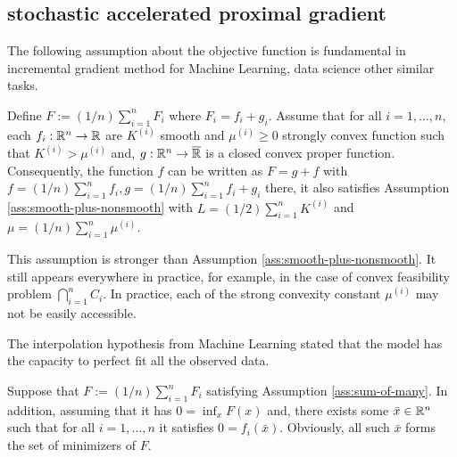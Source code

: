 \documentclass[12pt]{article}
\begin{document}

    
    \subsection{stochastic accelerated proximal gradient}
        The following assumption about the objective function is fundamental in incremental gradient method for Machine Learning, data science other similar tasks. 
        \begin{assumption}\label{ass:sum-of-many}
            Define $F := (1/n)\sum_{i = 1}^{n} F_i$ where $F_i = f_i + g_i$.
            Assume that for all $i = 1, \ldots, n$, each $f_i:\mathbb R^n \rightarrow \mathbb R$ are $K^{(i)}$ smooth and $\mu^{(i)} \ge 0$ strongly convex function such that $K^{(i)} > \mu^{(i)}$ and, $g:\mathbb R^n \rightarrow \overline {\mathbb R}$ is a closed convex proper function. 
            Consequently, the function $f$ can be written as $F = g + f$ with $f = (1/n)\sum_{i = 1}^{n} f_i, g = (1/n)\sum_{i = 1}^{n}f_i + g_i$ there, it also satisfies Assumption \ref{ass:smooth-plus-nonsmooth} with $L = (1/2)\sum_{i = 1}^n K^{(i)}$ and $\mu = (1/n)\sum_{i = 1}^{n}\mu^{(i)}$. 
        \end{assumption}
        This assumption is stronger than Assumption \ref{ass:smooth-plus-nonsmooth}. 
        It still appears everywhere in practice, for example, in the case of convex feasibility problem $\bigcap_{i = 1}^n C_i$. 
        In practice, each of the strong convexity constant $\mu^{(i)}$ may not be easily accessible. 
        \par
        The interpolation hypothesis from Machine Learning stated that the model has the capacity to perfect fit all the observed data. 
        \begin{assumption}\label{ass:interp-hypothesis}
            Suppose that $F := (1/n)\sum_{i = 1}^{n} F_i$ satisfying Assumption \ref{ass:sum-of-many}. 
            In addition, assuming that it has $0 = \inf_{x}F(x)$ and, there exists some $\bar x \in \mathbb R^n$ such that for all $i = 1, \ldots, n$ it satisfies $0 = f_i(\bar x)$. 
            Obviously, all such $\bar x$ forms the set of minimizers of $F$. 
        \end{assumption}
\end{document}
